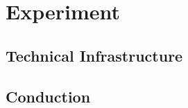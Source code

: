 
\section{Experiment} %
\label{sec:Experiment}

\subsection{Technical Infrastructure} %
\label{sub:Technical Infrastructure}



\subsection{Conduction} %
\label{sub:Conduction}

